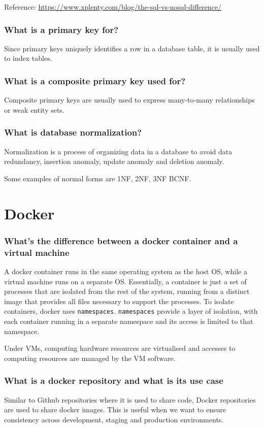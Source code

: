 \documentclass[12pt, a4paper]{article}
\newcommand{\code}[1]{\texttt{#1}}
\begin{document}
Reference: \url{https://www.xplenty.com/blog/the-sql-vs-nosql-difference/}

\subsubsection*{What is a primary key for?}
Since primary keys uniquely identifies a row in a database table, it is usually used to index tables.

\subsubsection*{What is a composite primary key used for?}
Composite primary keys are usually used to express many-to-many relationships or weak entity sets.

\subsubsection*{What is database normalization?}
Normalization is a process of organizing data in a database to avoid data redundancy, insertion anomaly, update anomaly and deletion anomaly.

Some examples of normal forms are 1NF, 2NF, 3NF BCNF.

\pagebreak

\section*{Docker}
\subsubsection*{What's the difference between a docker container and a virtual machine}
A docker container runs in the same operating system as the host OS, while a virtual machine runs on a separate OS.
Essentially, a container is just a set of processes that are isolated from the rest of the system, running from a distinct image that provides all files necessary to support the processes.
To isolate containers, docker uses \code{namespaces}. 
\code{namespaces} provide a layer of isolation, with each container running in a separate namespace and its access is limited to that namespace.

Under VMs, computing hardware resources are virtualised and accesses to computing resources are managed by the VM software.

\subsubsection*{What is a docker repository and what is its use case}
Similar to Github repositories where it is used to share code, Docker repositories are used to share docker images.
This is useful when we want to ensure consistency across development, staging and production environments.
\end{document}

